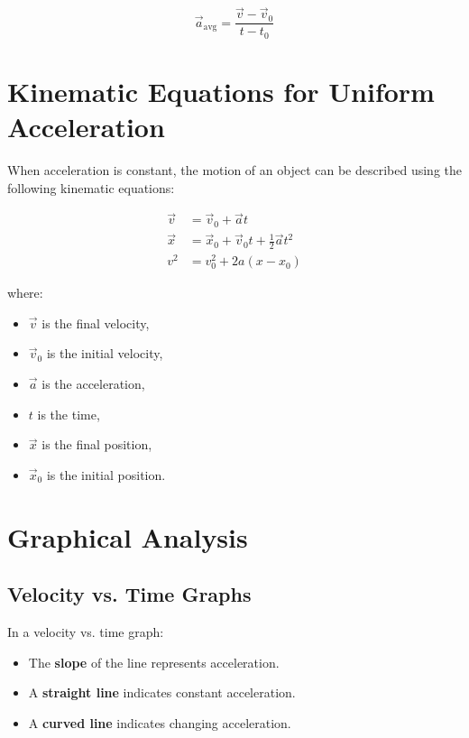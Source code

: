 \documentclass{article}
\begin{document}
\begin{equation}
\vec{a}_{\text{avg}} = \frac{\vec{v} - \vec{v}_0}{t - t_0}
\end{equation}

\section{Kinematic Equations for Uniform Acceleration}

When acceleration is constant, the motion of an object can be described using the following kinematic equations:

\begin{align}
\vec{v} &= \vec{v}_0 + \vec{a}t \label{eq1} \\
\vec{x} &= \vec{x}_0 + \vec{v}_0 t + \tfrac{1}{2} \vec{a} t^2 \label{eq2} \\
v^2 &= v_0^2 + 2a (x - x_0) \label{eq3}
\end{align}

where:
\begin{itemize}
    \item \( \vec{v} \) is the final velocity,
    \item \( \vec{v}_0 \) is the initial velocity,
    \item \( \vec{a} \) is the acceleration,
    \item \( t \) is the time,
    \item \( \vec{x} \) is the final position,
    \item \( \vec{x}_0 \) is the initial position.
\end{itemize}

\section{Graphical Analysis}

\subsection{Velocity vs. Time Graphs}

In a velocity vs. time graph:
\begin{itemize}
    \item The \textbf{slope} of the line represents acceleration.
    \item A \textbf{straight line} indicates constant acceleration.
    \item A \textbf{curved line} indicates changing acceleration.
\end{itemize}
\end{document}
